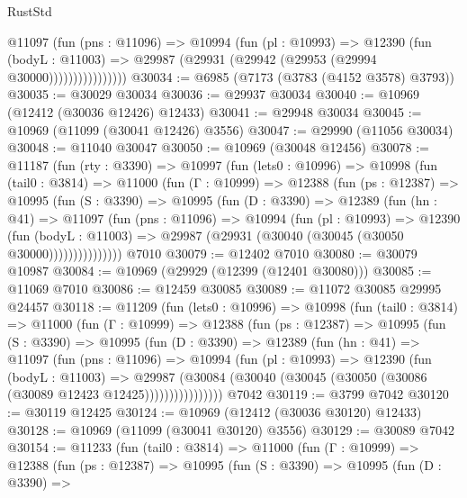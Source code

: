 \begin{lexlean}{RustStd}
\begin{coremodule}
                    @11097
                      (fun (pns : @11096) =>
                      @10994
                        (fun (pl : @10993) =>
                        @12390
                          (fun (bodyL : @11003) =>
                          @29987 (@29931 (@29942 (@29953 (@29994 @30000))))))))))))))))
@30034 := @6985 (@7173 (@3783 (@4152 @3578) @3793))
@30035 := @30029 @30034
@30036 := @29937 @30034
@30040 := @10969 (@12412 (@30036 @12426) @12433)
@30041 := @29948 @30034
@30045 := @10969 (@11099 (@30041 @12426) @3556)
@30047 := @29990 (@11056 @30034)
@30048 := @11040 @30047
@30050 := @10969 (@30048 @12456)
@30078 := @11187
    (fun (rty : @3390) =>
    @10997
      (fun (lets0 : @10996) =>
      @10998
        (fun (tail0 : @3814) =>
        @11000
          (fun (Γ : @10999) =>
          @12388
            (fun (ps : @12387) =>
            @10995
              (fun (S : @3390) =>
              @10995
                (fun (D : @3390) =>
                @12389
                  (fun (hn : @41) =>
                  @11097
                    (fun (pns : @11096) =>
                    @10994
                      (fun (pl : @10993) =>
                      @12390
                        (fun (bodyL : @11003) =>
                        @29987 (@29931 (@30040 (@30045 (@30050 @30000)))))))))))))))
    @7010
@30079 := @12402 @7010
@30080 := @30079 @10987
@30084 := @10969 (@29929 (@12399 (@12401 @30080)))
@30085 := @11069 @7010
@30086 := @12459 @30085
@30089 := @11072 @30085 @29995 @24457
@30118 := @11209
    (fun (lets0 : @10996) =>
    @10998
      (fun (tail0 : @3814) =>
      @11000
        (fun (Γ : @10999) =>
        @12388
          (fun (ps : @12387) =>
          @10995
            (fun (S : @3390) =>
            @10995
              (fun (D : @3390) =>
              @12389
                (fun (hn : @41) =>
                @11097
                  (fun (pns : @11096) =>
                  @10994
                    (fun (pl : @10993) =>
                    @12390
                      (fun (bodyL : @11003) =>
                      @29987
                        (@30084
                          (@30040 (@30045 (@30050 (@30086 (@30089 @12423 @12425))))))))))))))))
    @7042
@30119 := @3799 @7042
@30120 := @30119 @12425
@30124 := @10969 (@12412 (@30036 @30120) @12433)
@30128 := @10969 (@11099 (@30041 @30120) @3556)
@30129 := @30089 @7042
@30154 := @11233
    (fun (tail0 : @3814) =>
    @11000
      (fun (Γ : @10999) =>
      @12388
        (fun (ps : @12387) =>
        @10995
          (fun (S : @3390) =>
          @10995
            (fun (D : @3390) =>

\end{coremodule}
\end{lexlean}
